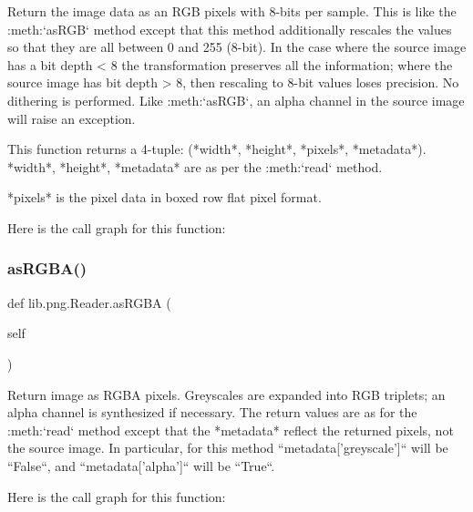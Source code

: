 \begin{DoxyVerb}Return the image data as an RGB pixels with 8-bits per
sample.  This is like the :meth:`asRGB` method except that
this method additionally rescales the values so that they
are all between 0 and 255 (8-bit).  In the case where the
source image has a bit depth < 8 the transformation preserves
all the information; where the source image has bit depth
> 8, then rescaling to 8-bit values loses precision.  No
dithering is performed.  Like :meth:`asRGB`, an alpha channel
in the source image will raise an exception.

This function returns a 4-tuple:
(*width*, *height*, *pixels*, *metadata*).
*width*, *height*, *metadata* are as per the
:meth:`read` method.

*pixels* is the pixel data in boxed row flat pixel format.
\end{DoxyVerb}
 Here is the call graph for this function\+:
\mbox{\label{classlib_1_1png_1_1_reader_a245e000fa789414e0caa35e98fae3f08}} 
\subsubsection{\texorpdfstring{as\+R\+G\+B\+A()}{asRGBA()}}
{\footnotesize\ttfamily def lib.\+png.\+Reader.\+as\+R\+G\+BA (\begin{DoxyParamCaption}\item[{}]{self }\end{DoxyParamCaption})}

\begin{DoxyVerb}Return image as RGBA pixels.  Greyscales are expanded into
RGB triplets; an alpha channel is synthesized if necessary.
The return values are as for the :meth:`read` method
except that the *metadata* reflect the returned pixels, not the
source image.  In particular, for this method
``metadata['greyscale']`` will be ``False``, and
``metadata['alpha']`` will be ``True``.
\end{DoxyVerb}
 Here is the call graph for this function\+:
\mbox{\label{classlib_1_1png_1_1_reader_a2e3c246de50a87e148a43ba42f6faac0}} 
